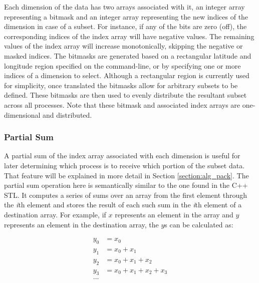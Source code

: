 Each dimension of the data has two arrays associated with it, an integer array
representing a bitmask and an integer array representing the new indices of
the dimension in case of a subset.  For instance, if any of the bits are zero
(off), the corresponding indices of the index array will have negative values.
The remaining values of the index array will increase monotonically, skipping
the negative or masked indices.  The bitmasks are generated based on a
rectangular latitude and longitude region specified on the command-line, or by
specifying one or more indices of a dimension to select.  Although a
rectangular region is currently used for simplicity, once translated the
bitmasks allow for arbitrary subsets to be defined.  These bitmasks are then
used to evenly distribute the resultant subset across all processes.  Note
that these bitmask and associated index arrays are one-dimensional and
distributed.

\subsubsection{Partial Sum}


A partial sum of the index array associated with each dimension is useful for
later determining which process is to receive which portion of the subset
data.  That feature will be explained in more detail in Section
\ref{section:alg_pack}.  The partial sum operation here is semantically
similar to the one found in the C++ STL\cite{CXXSTL}.  It computes a series of
sums over an array from the first element through the \emph{i}th element and
stores the result of each such sum in the \emph{i}th element of a destination
array.  For example, if $x$ represents an element in the array and $y$
represents an element in the destination array, the $y$s can be calculated as:

\begin{equation}
\begin{split}
y_0 &= x_0\\
y_1 &= x_0 + x_1\\
y_2 &= x_0 + x_1 + x_2\\
y_3 &= x_0 + x_1 + x_2 + x_3\\
\ldots
\end{split}
\end{equation}

